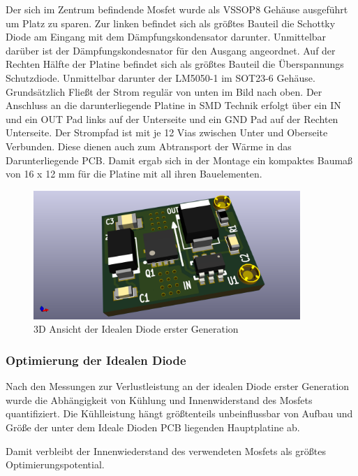 Der sich im Zentrum befindende Mosfet wurde als VSSOP8 Gehäuse ausgeführt um Platz zu sparen. Zur linken befindet sich als größtes Bauteil die Schottky Diode am Eingang mit dem Dämpfungskondensator darunter. Unmittelbar darüber ist der Dämpfungskondesnator für den Ausgang angeordnet. Auf der Rechten Hälfte der Platine befindet sich als größtes Bauteil die Überspannungs Schutzdiode. Unmittelbar darunter der LM5050-1 im SOT23-6 Gehäuse.
Grundsätzlich Fließt der Strom regulär von unten im Bild nach oben.
Der Anschluss an die darunterliegende Platine in SMD Technik erfolgt über ein IN und ein OUT Pad links auf der Unterseite und ein GND Pad auf der Rechten Unterseite.
Der Strompfad ist mit je 12 Vias zwischen Unter und Oberseite Verbunden. Diese dienen auch zum Abtransport der Wärme in das Darunterliegende PCB.
Damit ergab sich in der Montage ein kompaktes Baumaß von 16 x 12 mm für die Platine mit all ihren Bauelementen.

\begin{figure}[H]
\centering
\includegraphics[width=0.9\textwidth]{bilder/Ideale_Diode/Ideale_Diode_Mini_rev01_ver00-3D.png} 
\caption{3D Ansicht der Idealen Diode erster Generation} 
\label{fig:3D Ansicht der Idealen Diode erster Generation}
\end{figure}

\subsubsection{Optimierung der Idealen Diode}

Nach den Messungen zur Verlustleistung an der idealen Diode erster Generation wurde die Abhängigkeit von Kühlung und Innenwiderstand des Mosfets quantifiziert. 
Die Kühlleistung hängt größtenteils unbeinflussbar von Aufbau und Größe der unter dem Ideale Dioden PCB liegenden Hauptplatine ab.

Damit verbleibt der Innenwiederstand des verwendeten Mosfets als größtes Optimierungspotential.

